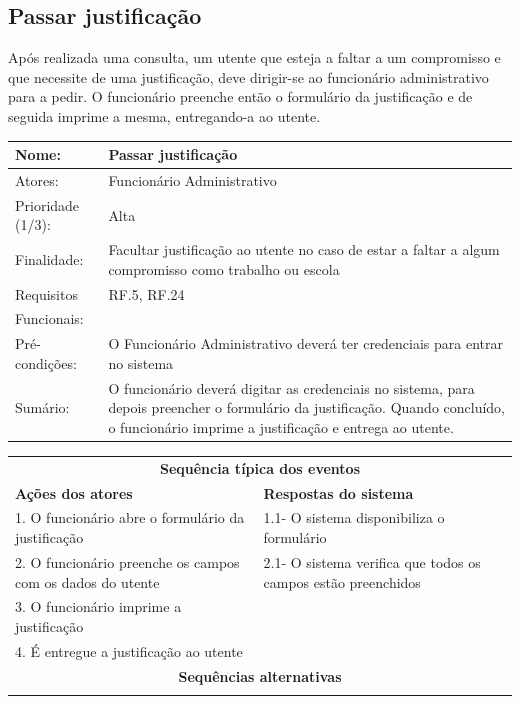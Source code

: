 \documentclass[11pt,a4paper,twoside]{report}
\begin{document}
\subsection{Passar justificação}

Após realizada uma consulta, um utente que esteja a faltar a um compromisso e que necessite de uma justificação, deve dirigir-se ao funcionário administrativo para a pedir. O funcionário preenche então o formulário da justificação e de seguida imprime a mesma, entregando-a ao utente. 

\begin{center}
	\begin{tabularx}{\textwidth}{|lX|}
		\hline
		\textbf{Nome}: & \textbf{Passar justificação } \\ \hline
		Atores: & Funcionário Administrativo   \\ \hline
		Prioridade (1/3): & Alta \\ \hline
		Finalidade: & Facultar justificação ao utente no caso de estar a faltar a algum compromisso como trabalho ou escola     \\ \hline
		Requisitos & RF.5, RF.24   \\
		Funcionais: & \\
		Pré-condições: & O Funcionário Administrativo deverá ter credenciais para entrar no sistema    \\
		Sumário: & O funcionário deverá digitar as credenciais no sistema, para depois preencher o formulário da justificação. Quando concluído, o funcionário imprime a justificação e entrega ao utente.   \\
		\hline
	\end{tabularx}
	
	\begin{tabularx}{\textwidth}{|XX|}
		\hline
		\multicolumn{2}{|c|}{\textbf{Sequência típica dos eventos} }\\
		\textbf{Ações dos atores}  & \textbf{Respostas do sistema} \\
		1.      O funcionário abre o formulário da justificação     & 1.1- O sistema disponibiliza o formulário  \\
		2.          O funcionário preenche os campos com os dados do utente      & 2.1- O sistema verifica que todos os campos estão preenchidos     \\
	    3. O funcionário imprime a justificação  & \\
	    4.  É entregue a justificação ao utente & \\
		\hline
		\multicolumn{2}{|c|}{\textbf{Sequências alternativas } }\\
		\hline
		\multicolumn{2}{|l|}{  }\\
		\hline
	\end{tabularx}
	
\end{center}
\end{document}
